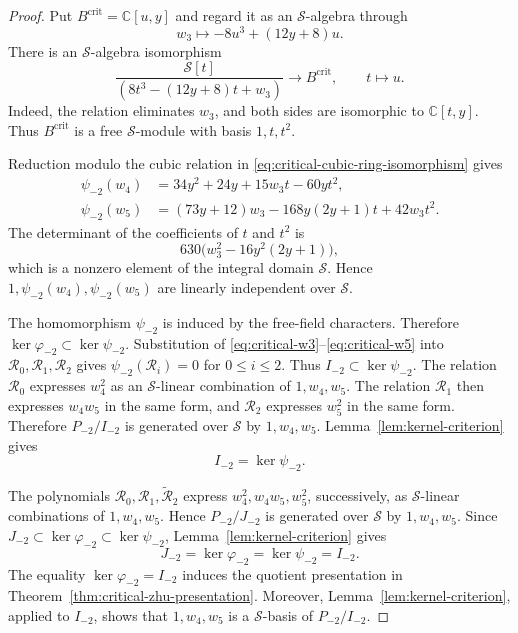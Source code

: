\documentclass[11 pt]{amsart}
\theoremstyle{definition}
\theoremstyle{plain}
\begin{document}
\begin{proof}
Put $B^{\mathrm{crit}}=\mathbb C[u,y]$ and regard it as an
$\mathcal S$-algebra through
\[
w_3\longmapsto-8u^3+(12y+8)u.
\]
There is an $\mathcal S$-algebra isomorphism
\begin{equation}\label{eq:critical-cubic-ring-isomorphism}
\frac{\mathcal S[t]}
{(8t^3-(12y+8)t+w_3)}
\longrightarrow B^{\mathrm{crit}},
\qquad t\longmapsto u.
\end{equation}
Indeed, the relation eliminates $w_3$, and both sides are isomorphic
to $\mathbb C[t,y]$. Thus $B^{\mathrm{crit}}$ is a free
$\mathcal S$-module with basis $1,t,t^2$.

Reduction modulo the cubic relation in
\eqref{eq:critical-cubic-ring-isomorphism} gives
\begin{align}
\psi_{-2}(w_4)
&=34y^2+24y+15w_3t-60yt^2,\label{eq:critical-reduction-w4}\\
\psi_{-2}(w_5)
&=(73y+12)w_3-168y(2y+1)t+42w_3t^2.
\label{eq:critical-reduction-w5}
\end{align}
The determinant of the coefficients of $t$ and $t^2$ is
\[
630\bigl(w_3^2-16y^2(2y+1)\bigr),
\]
which is a nonzero element of the integral domain $\mathcal S$. Hence
$1,\psi_{-2}(w_4),\psi_{-2}(w_5)$ are linearly independent over
$\mathcal S$.

The homomorphism $\psi_{-2}$ is induced by the free-field characters.
Therefore $\ker\varphi_{-2}\subset\ker\psi_{-2}$.
Substitution of \eqref{eq:critical-w3}--\eqref{eq:critical-w5} into
$\mathcal R_0,\mathcal R_1,\mathcal R_2$ gives
$\psi_{-2}(\mathcal R_i)=0$ for $0\leq i\leq2$.
Thus $I_{-2}\subset\ker\psi_{-2}$. The relation
$\mathcal R_0$ expresses $w_4^2$ as an
$\mathcal S$-linear combination of $1,w_4,w_5$.
The relation $\mathcal R_1$ then expresses $w_4w_5$ in the same form,
and $\mathcal R_2$ expresses $w_5^2$ in the same form.
Therefore $P_{-2}/I_{-2}$ is generated over $\mathcal S$ by
$1,w_4,w_5$. Lemma~\ref{lem:kernel-criterion} gives
\[
I_{-2}=\ker\psi_{-2}.
\]

The polynomials
$\mathcal R_0,\mathcal R_1,\widetilde{\mathcal R}_2$ express
$w_4^2,w_4w_5,w_5^2$, successively, as $\mathcal S$-linear
combinations of $1,w_4,w_5$. Hence $P_{-2}/J_{-2}$ is generated over
$\mathcal S$ by  $1,w_4,w_5$. Since
$J_{-2}\subset\ker\varphi_{-2}\subset\ker\psi_{-2}$,
Lemma~\ref{lem:kernel-criterion} gives
\[
J_{-2}=\ker\varphi_{-2}=\ker\psi_{-2}=I_{-2}.
\]
The equality $\ker\varphi_{-2}=I_{-2}$ induces the quotient
presentation in Theorem~\ref{thm:critical-zhu-presentation}.
Moreover, Lemma~\ref{lem:kernel-criterion}, applied to $I_{-2}$,
shows that   $1,w_4,w_5$  is a
$\mathcal S$-basis of $P_{-2}/I_{-2}$.
\end{proof}
\end{document}
